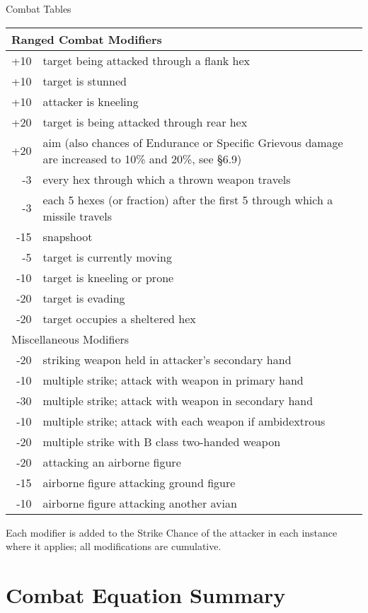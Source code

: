 \begin{Tables}{Combat Tables}
\begin{multicols}{3}
\begin{tabularx}{\columnwidth}{rX}
\multicolumn{2}{l}{Ranged Combat Modifiers} \\ \hline
+10	& target being attacked through a flank hex \\
+10	& target is stunned \\
+10	& attacker is kneeling \\
+20	& target is being attacked through rear hex \\
+20	& aim (also chances of Endurance or Specific Grievous damage are increased to 10\% and 20\%, see §6.9) \\
-3	& every hex through which a thrown weapon travels \\
-3	& each 5 hexes (or fraction) after the first 5 through which a missile travels \\
-15	& snapshoot \\
-5	& target is currently moving \\
-10	& target is kneeling or prone \\
-20	& target is evading \\
-20	& target occupies a sheltered hex \\ \hline
\multicolumn{2}{l}{Miscellaneous Modifiers} \\ \hline
-20	& striking weapon held in attacker’s secondary hand \\
-10	& multiple strike; attack with weapon in primary hand \\
-30	& multiple strike; attack with weapon in secondary hand \\
-10	& multiple strike; attack with each weapon if ambidextrous \\
-20	& multiple strike with B class two-handed weapon \\
-20	& attacking an airborne figure \\
-15	& airborne figure attacking ground figure \\
-10	& airborne figure attacking another avian \\
\end{tabularx}

Each modifier is added to the Strike Chance of the attacker in each
instance where it applies; all modifications are cumulative.

\vfill

\section{Combat Equation Summary}


\end{multicols}
\end{Tables}
